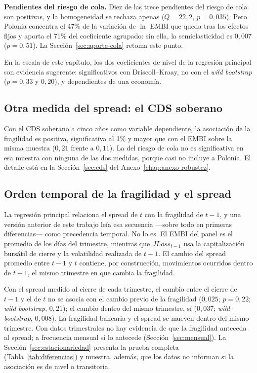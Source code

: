 \textbf{Pendientes del riesgo de cola.} Diez de las trece pendientes del riesgo de cola son positivas, y la homogeneidad se rechaza apenas ($Q=22{,}2$, $p=0{,}035$). Pero Polonia concentra el 47\% de la variación de $\ln$ EMBI que queda tras los efectos fijos y aporta el 71\% del coeficiente agrupado: sin ella, la semielasticidad es $0{,}007$ ($p=0{,}51$). La Sección~\ref{sec:aporte-cola} retoma este punto.

En la escala de este capítulo, los dos coeficientes de nivel de la regresión principal son evidencia sugerente: significativos con Driscoll--Kraay, no con el \textit{wild bootstrap} ($p=0{,}33$ y $0{,}20$), y dependientes de una economía.

\subsection{Otra medida del spread: el CDS soberano}

Con el CDS soberano a cinco años como variable dependiente, la asociación de la fragilidad es positiva, significativa al 1\% y mayor que con el EMBI sobre la misma muestra ($0{,}21$ frente a $0{,}11$). La del riesgo de cola no es significativa en esa muestra con ninguna de las dos medidas, porque casi no incluye a Polonia. El detalle está en la Sección~\ref{sec:cds} del Anexo~\ref{chap:anexo-robustez}.

\subsection{Orden temporal de la fragilidad y el spread}
\label{sec:mismo-trimestre}

La regresión principal relaciona el spread de $t$ con la fragilidad de $t-1$, y una versión anterior de este trabajo leía esa secuencia ---sobre todo en primeras diferencias--- como precedencia temporal. No lo es. El EMBI del panel es el promedio de los días del trimestre, mientras que $JLoss_{t-1}$ usa la capitalización bursátil de cierre y la volatilidad realizada de $t-1$. El cambio del spread promedio entre $t-1$ y $t$ contiene, por construcción, movimientos ocurridos dentro de $t-1$, el mismo trimestre en que cambia la fragilidad.

Con el spread medido al cierre de cada trimestre, el cambio entre el cierre de $t-1$ y el de $t$ no se asocia con el cambio previo de la fragilidad ($0{,}025$; $p=0{,}22$; \textit{wild bootstrap}, $0{,}21$); el cambio dentro del mismo trimestre, sí ($0{,}037$; \textit{wild bootstrap}, $0{,}008$). La fragilidad bancaria y el spread se mueven dentro del mismo trimestre. Con datos trimestrales no hay evidencia de que la fragilidad anteceda al spread; a frecuencia mensual sí lo antecede (Sección~\ref{sec:mensual}). La Sección~\ref{sec:estacionariedad} presenta la prueba completa (Tabla~\ref{tab:diferencias}) y muestra, además, que los datos no informan si la asociación es de nivel o transitoria.

